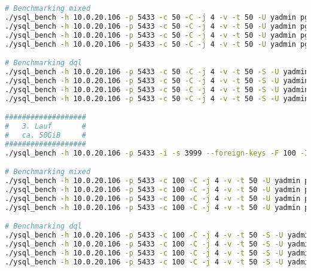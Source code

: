 \begin{flushleft}
\begin{lstlisting}[language=bash, caption=YugabyteDB - Benchmarking-Commands,captionpos=b,label={lst:yugabytedb-benchmarking-commands},breaklines=true]
# Benchmarking mixed
./ysql_bench -h 10.0.20.106 -p 5433 -c 50 -C -j 4 -v -t 50 -U yadmin pgbench_eval_bench > /home/gramic/2_1_yugabytedb_mixed_benchmark.txt
./ysql_bench -h 10.0.20.106 -p 5433 -c 50 -C -j 4 -v -t 50 -U yadmin pgbench_eval_bench > /home/gramic/2_2_yugabytedb_mixed_benchmark.txt
./ysql_bench -h 10.0.20.106 -p 5433 -c 50 -C -j 4 -v -t 50 -U yadmin pgbench_eval_bench > /home/gramic/2_3_yugabytedb_mixed_benchmark.txt
./ysql_bench -h 10.0.20.106 -p 5433 -c 50 -C -j 4 -v -t 50 -U yadmin pgbench_eval_bench > /home/gramic/2_4_yugabytedb_mixed_benchmark.txt

# Benchmarking dql
./ysql_bench -h 10.0.20.106 -p 5433 -c 50 -C -j 4 -v -t 50 -S -U yadmin pgbench_eval_bench > /home/gramic/2_1_yugabytedb_dql_benchmark.txt
./ysql_bench -h 10.0.20.106 -p 5433 -c 50 -C -j 4 -v -t 50 -S -U yadmin pgbench_eval_bench > /home/gramic/2_2_yugabytedb_dql_benchmark.txt
./ysql_bench -h 10.0.20.106 -p 5433 -c 50 -C -j 4 -v -t 50 -S -U yadmin pgbench_eval_bench > /home/gramic/2_3_yugabytedb_dql_benchmark.txt
./ysql_bench -h 10.0.20.106 -p 5433 -c 50 -C -j 4 -v -t 50 -S -U yadmin pgbench_eval_bench > /home/gramic/2_4_yugabytedb_dql_benchmark.txt

###################
#   3. Lauf       #
#   ca. 50GiB     #
###################
./ysql_bench -h 10.0.20.106 -p 5433 -i -s 3999 --foreign-keys -F 100 -I dtgvpf --index-tablespace=eval_index_tablespace --tablespace=eval_data_tablespace -U yadmin pgbench_eval_bench

# Benchmarking mixed
./ysql_bench -h 10.0.20.106 -p 5433 -c 100 -C -j 4 -v -t 50 -U yadmin pgbench_eval_bench > /home/gramic/3_1_yugabytedb_mixed_benchmark.txt
./ysql_bench -h 10.0.20.106 -p 5433 -c 100 -C -j 4 -v -t 50 -U yadmin pgbench_eval_bench > /home/gramic/3_2_yugabytedb_mixed_benchmark.txt
./ysql_bench -h 10.0.20.106 -p 5433 -c 100 -C -j 4 -v -t 50 -U yadmin pgbench_eval_bench > /home/gramic/3_3_yugabytedb_mixed_benchmark.txt
./ysql_bench -h 10.0.20.106 -p 5433 -c 100 -C -j 4 -v -t 50 -U yadmin pgbench_eval_bench > /home/gramic/3_4_yugabytedb_mixed_benchmark.txt

# Benchmarking dql
./ysql_bench -h 10.0.20.106 -p 5433 -c 100 -C -j 4 -v -t 50 -S -U yadmin pgbench_eval_bench > /home/gramic/3_1_yugabytedb_dql_benchmark.txt
./ysql_bench -h 10.0.20.106 -p 5433 -c 100 -C -j 4 -v -t 50 -S -U yadmin pgbench_eval_bench > /home/gramic/3_2_yugabytedb_dql_benchmark.txt
./ysql_bench -h 10.0.20.106 -p 5433 -c 100 -C -j 4 -v -t 50 -S -U yadmin pgbench_eval_bench > /home/gramic/3_3_yugabytedb_dql_benchmark.txt
./ysql_bench -h 10.0.20.106 -p 5433 -c 100 -C -j 4 -v -t 50 -S -U yadmin pgbench_eval_bench > /home/gramic/3_4_yugabytedb_dql_benchmark.txt



\end{lstlisting}
\end{flushleft}

